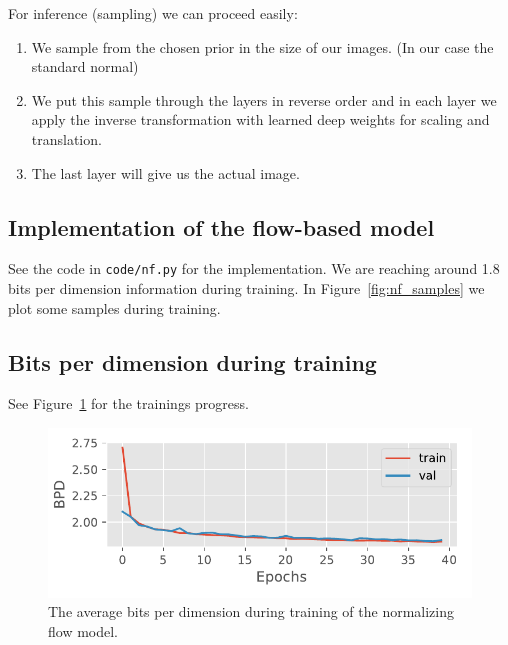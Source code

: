 \documentclass{article}
\begin{document}
For inference (sampling) we can proceed easily:
\begin{enumerate}
  \item We sample from the chosen prior in the size of our images. (In our case the standard normal)
  \item We put this sample through the layers in reverse order and in each layer we apply the inverse transformation with learned deep weights for scaling and translation.
  \item The last layer will give us the actual image.
\end{enumerate}

\subsection{Implementation of the flow-based model}
See the code in \texttt{code/nf.py} for the implementation.
We are reaching around 1.8 bits per dimension information during training.
In Figure~\ref{fig:nf_samples} we plot some samples during training.

\subsection{Bits per dimension during training}
See Figure~\ref{fig:nf} for the trainings progress.
\begin{figure}
  \centering
  \includegraphics[width=0.8\linewidth]{assignment_3/code/figures/nf.pdf}
  \caption{The average bits per dimension during training of the normalizing flow model.}
  \label{fig:nf}
\end{figure}
\end{document}
